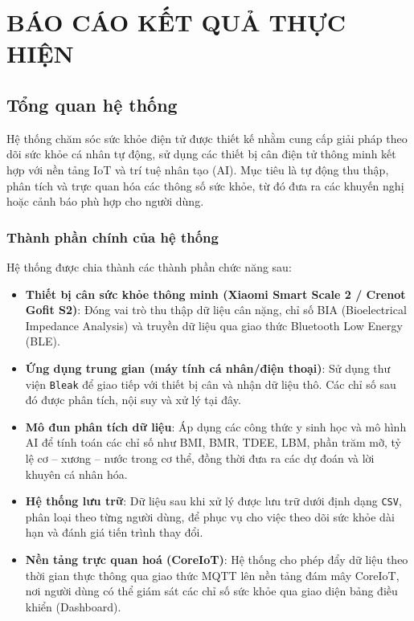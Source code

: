 \section{BÁO CÁO KẾT QUẢ THỰC HIỆN}

\subsection{Tổng quan hệ thống}

Hệ thống chăm sóc sức khỏe điện tử được thiết kế nhằm cung cấp giải pháp theo dõi sức khỏe cá nhân tự động, sử dụng các thiết bị cân điện tử thông minh kết hợp với nền tảng IoT và trí tuệ nhân tạo (AI). Mục tiêu là tự động thu thập, phân tích và trực quan hóa các thông số sức khỏe, từ đó đưa ra các khuyến nghị hoặc cảnh báo phù hợp cho người dùng.

\subsubsection{Thành phần chính của hệ thống}

Hệ thống được chia thành các thành phần chức năng sau:

\begin{itemize}
  \item \textbf{Thiết bị cân sức khỏe thông minh (Xiaomi Smart Scale 2 / Crenot Gofit S2)}: Đóng vai trò thu thập dữ liệu cân nặng, chỉ số BIA (Bioelectrical Impedance Analysis) và truyền dữ liệu qua giao thức Bluetooth Low Energy (BLE).
  
  \item \textbf{Ứng dụng trung gian (máy tính cá nhân/điện thoại)}: Sử dụng thư viện \texttt{Bleak} để giao tiếp với thiết bị cân và nhận dữ liệu thô. Các chỉ số sau đó được phân tích, nội suy và xử lý tại đây.
  
  \item \textbf{Mô đun phân tích dữ liệu}: Áp dụng các công thức y sinh học và mô hình AI để tính toán các chỉ số như BMI, BMR, TDEE, LBM, phần trăm mỡ, tỷ lệ cơ – xương – nước trong cơ thể, đồng thời đưa ra các dự đoán và lời khuyên cá nhân hóa.
  
  \item \textbf{Hệ thống lưu trữ}: Dữ liệu sau khi xử lý được lưu trữ dưới định dạng \texttt{CSV}, phân loại theo từng người dùng, để phục vụ cho việc theo dõi sức khỏe dài hạn và đánh giá tiến trình thay đổi.
  
  \item \textbf{Nền tảng trực quan hoá (CoreIoT)}: Hệ thống cho phép đẩy dữ liệu theo thời gian thực thông qua giao thức MQTT lên nền tảng đám mây CoreIoT, nơi người dùng có thể giám sát các chỉ số sức khỏe qua giao diện bảng điều khiển (Dashboard).
\end{itemize}

